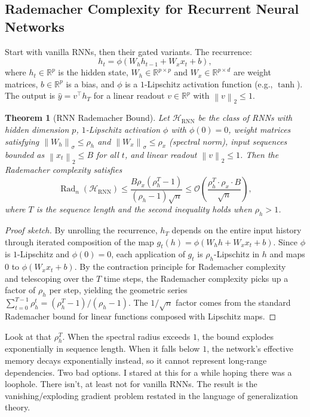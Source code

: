 \documentclass[11pt]{article}
\newtheorem{theorem}{Theorem}[section]
\theoremstyle{definition}
\theoremstyle{remark}
\newcommand{\R}{\mathbb{R}}
\newcommand{\cH}{\mathcal{H}}
\newcommand{\cO}{\mathcal{O}}
\DeclareMathOperator{\Rad}{Rad}
\newcommand{\norm}[1]{\left\lVert #1 \right\rVert}
\begin{document}
\subsection{Rademacher Complexity for Recurrent Neural Networks}\label{sec:theory:rnn}

Start with vanilla RNNs, then their gated variants.
The recurrence:
\[
    h_t = \phi(W_h h_{t-1} + W_x x_t + b),
\]
where $h_t \in \R^p$ is the hidden state, $W_h \in \R^{p \times p}$ and $W_x \in \R^{p \times d}$ are weight matrices, $b \in \R^p$ is a bias, and $\phi$ is a $1$-Lipschitz activation function (e.g., $\tanh$).
The output is $\hat{y} = v^\top h_T$ for a linear readout $v \in \R^p$ with $\norm{v}_2 \leq 1$.

\begin{theorem}[RNN Rademacher Bound]\label{thm:rnn_bound}
Let $\cH_{\mathrm{RNN}}$ be the class of RNNs with hidden dimension $p$, $1$-Lipschitz activation $\phi$ with $\phi(0) = 0$, weight matrices satisfying $\norm{W_h}_\sigma \leq \rho_h$ and $\norm{W_x}_\sigma \leq \rho_x$ (spectral norm), input sequences bounded as $\norm{x_t}_2 \leq B$ for all $t$, and linear readout $\norm{v}_2 \leq 1$.
Then the Rademacher complexity satisfies
\[
    \Rad_n(\cH_{\mathrm{RNN}}) \leq \frac{B \rho_x (\rho_h^T - 1)}{(\rho_h - 1)\sqrt{n}} \leq \cO\!\left( \frac{\rho_h^T \cdot \rho_x \cdot B}{\sqrt{n}} \right),
\]
where $T$ is the sequence length and the second inequality holds when $\rho_h > 1$.
\end{theorem}

\begin{proof}[Proof sketch]
By unrolling the recurrence, $h_T$ depends on the entire input history through iterated composition of the map $g_t(h) = \phi(W_h h + W_x x_t + b)$.
Since $\phi$ is $1$-Lipschitz and $\phi(0) = 0$, each application of $g_t$ is $\rho_h$-Lipschitz in $h$ and maps $0$ to $\phi(W_x x_t + b)$.
By the contraction principle for Rademacher complexity~\citep{mohri2018foundations} and telescoping over the $T$ time steps, the Rademacher complexity picks up a factor of $\rho_h$ per step, yielding the geometric series $\sum_{t=0}^{T-1} \rho_h^t = (\rho_h^T - 1)/(\rho_h - 1)$.
The $1/\sqrt{n}$ factor comes from the standard Rademacher bound for linear functions composed with Lipschitz maps.
\end{proof}

Look at that $\rho_h^T$.
When the spectral radius exceeds $1$, the bound explodes exponentially in sequence length.
When it falls below $1$, the network's effective memory decays exponentially instead, so it cannot represent long-range dependencies.
Two bad options.
I stared at this for a while hoping there was a loophole.
There isn't, at least not for vanilla RNNs.
The result is the vanishing/exploding gradient problem restated in the language of generalization theory.
\end{document}

